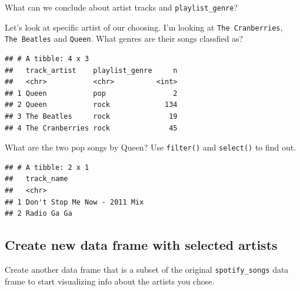 \documentclass[
]{book}
\newenvironment{Shaded}{\begin{snugshade}}{\end{snugshade}}
\newcommand{\CommentTok}[1]{\textcolor[rgb]{0.56,0.35,0.01}{\textit{#1}}}
\newcommand{\KeywordTok}[1]{\textcolor[rgb]{0.13,0.29,0.53}{\textbf{#1}}}
\newcommand{\NormalTok}[1]{#1}
\newcommand{\OperatorTok}[1]{\textcolor[rgb]{0.81,0.36,0.00}{\textbf{#1}}}
\newcommand{\StringTok}[1]{\textcolor[rgb]{0.31,0.60,0.02}{#1}}
\begin{document}
What can we conclude about artist tracks and \texttt{playlist\_genre}?

Let's look at specific artist of our choosing. I'm looking at \texttt{The\ Cranberries}, \texttt{The\ Beatles} and \texttt{Queen}.
What genres are their songs classfied as?

\begin{verbatim}
## # A tibble: 4 x 3
##   track_artist    playlist_genre     n
##   <chr>           <chr>          <int>
## 1 Queen           pop                2
## 2 Queen           rock             134
## 3 The Beatles     rock              19
## 4 The Cranberries rock              45
\end{verbatim}

What are the two pop songs by Queen? Use \texttt{filter()} and \texttt{select()} to find out.

\begin{verbatim}
## # A tibble: 2 x 1
##   track_name                  
##   <chr>                       
## 1 Don't Stop Me Now - 2011 Mix
## 2 Radio Ga Ga
\end{verbatim}

\hypertarget{create-new-data-frame-with-selected-artists}{%
\subsection{Create new data frame with selected artists}\label{create-new-data-frame-with-selected-artists}}

Create another data frame that is a subset of the original \texttt{spotify\_songs} data frame to start visualizing info about the artists you chose.

\begin{Shaded}
\end{Shaded}
\end{document}
